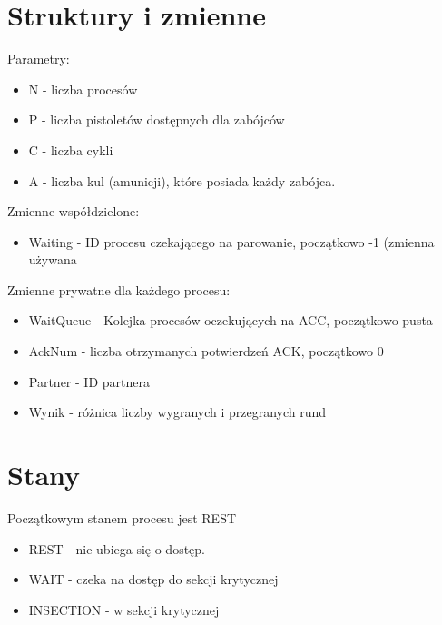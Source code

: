 \documentclass[11pt]{article}
\begin{document}
\section{Struktury i zmienne}
Parametry:
\begin{itemize}
    \item N - liczba procesów
    \item P - liczba pistoletów dostępnych dla zabójców
    \item C - liczba cykli
    \item A - liczba kul (amunicji), które posiada każdy zabójca. 
\end{itemize}
Zmienne współdzielone:
\begin{itemize}
    \item Waiting - ID procesu czekającego na parowanie, początkowo -1 (zmienna używana
\end{itemize}
Zmienne prywatne dla każdego procesu:
\begin{itemize}
    \item WaitQueue - Kolejka procesów oczekujących na ACC, początkowo pusta
    \item AckNum - liczba otrzymanych potwierdzeń ACK, początkowo 0
    \item Partner - ID partnera
    \item Wynik - różnica liczby wygranych i przegranych rund
\end{itemize}

\section{Stany}
Początkowym stanem procesu jest REST
\begin{itemize}
    \item REST - nie ubiega się o dostęp.
    \item WAIT - czeka na dostęp do sekcji krytycznej
    \item INSECTION - w sekcji krytycznej
\end{itemize} 
\end{document}
